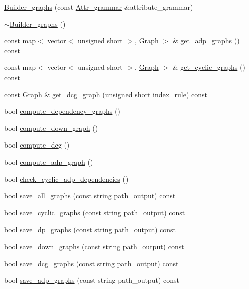 \begin{CompactItemize}
\item 
\hyperlink{classgenevalmag_1_1Builder__graphs_6220015a296aed77686fd9382e2917e3}{Builder\_\-graphs} (const \hyperlink{classgenevalmag_1_1Attr__grammar}{Attr\_\-grammar} \&attribute\_\-grammar)
\item 
\hyperlink{classgenevalmag_1_1Builder__graphs_1185fa86f07038e594e0292a7d6c5f36}{$\sim$Builder\_\-graphs} ()
\item 
const map$<$ vector$<$ unsigned short $>$, \hyperlink{namespacegenevalmag_4a96de9ebfc7d48233406ab9cad55cb5}{Graph} $>$ \& \hyperlink{classgenevalmag_1_1Builder__graphs_96271a5edae352ea39ad4f627877d8a4}{get\_\-adp\_\-graphs} () const 
\item 
const map$<$ vector$<$ unsigned short $>$, \hyperlink{namespacegenevalmag_4a96de9ebfc7d48233406ab9cad55cb5}{Graph} $>$ \& \hyperlink{classgenevalmag_1_1Builder__graphs_4abbda95aa3d42fc06328c31ff5d63e1}{get\_\-cyclic\_\-graphs} () const 
\item 
const \hyperlink{namespacegenevalmag_4a96de9ebfc7d48233406ab9cad55cb5}{Graph} \& \hyperlink{classgenevalmag_1_1Builder__graphs_5850a6c7a2248394ead2b63aeca7ff9b}{get\_\-dcg\_\-graph} (unsigned short index\_\-rule) const 
\item 
bool \hyperlink{classgenevalmag_1_1Builder__graphs_cd8de1287317a25e559f4aede929fe66}{compute\_\-dependency\_\-graphs} ()
\item 
bool \hyperlink{classgenevalmag_1_1Builder__graphs_dc8ee86b8d769a7b42c43361fa7076cb}{compute\_\-down\_\-graph} ()
\item 
bool \hyperlink{classgenevalmag_1_1Builder__graphs_f41d4e9683653a0d47fa45406a2ca594}{compute\_\-dcg} ()
\item 
bool \hyperlink{classgenevalmag_1_1Builder__graphs_497bbd54a1f3197e22743dcf2ad27da3}{compute\_\-adp\_\-graph} ()
\item 
bool \hyperlink{classgenevalmag_1_1Builder__graphs_278e4c659e6fd91e1f3fc8d37a0edea9}{check\_\-cyclic\_\-adp\_\-dependencies} ()
\item 
bool \hyperlink{classgenevalmag_1_1Builder__graphs_95525c606a1189a5fe0096f72938555d}{save\_\-all\_\-graphs} (const string path\_\-output) const 
\item 
bool \hyperlink{classgenevalmag_1_1Builder__graphs_81bf79709c133320f4d40cdee1f61466}{save\_\-cyclic\_\-graphs} (const string path\_\-output) const 
\item 
bool \hyperlink{classgenevalmag_1_1Builder__graphs_525d16f83c419ec6751379b860c625d6}{save\_\-dp\_\-graphs} (const string path\_\-output) const 
\item 
bool \hyperlink{classgenevalmag_1_1Builder__graphs_18516e61124884d50ee9fb14f833ca01}{save\_\-down\_\-graphs} (const string path\_\-output) const 
\item 
bool \hyperlink{classgenevalmag_1_1Builder__graphs_572e65e40e16066f068c82af178c22c2}{save\_\-dcg\_\-graphs} (const string path\_\-output) const 
\item 
bool \hyperlink{classgenevalmag_1_1Builder__graphs_af2e8aa86ea96212833d769110eeaebd}{save\_\-adp\_\-graphs} (const string path\_\-output) const 
\end{CompactItemize}
